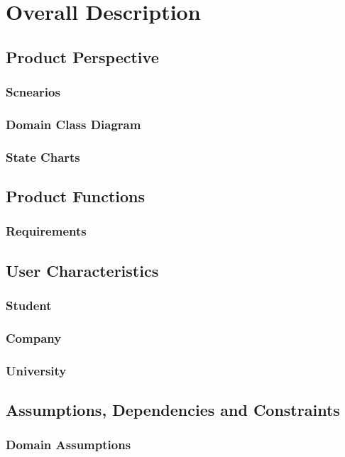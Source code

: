 \chapter{Overall Description}

\section{Product Perspective}
\subsection{Scnearios}
\subsection{Domain Class Diagram}
\subsection{State Charts}

\section{Product Functions}
\subsection{Requirements}

\section{User Characteristics}
\subsection{Student}
\subsection{Company}
\subsection{University}

\section{Assumptions, Dependencies and Constraints}
\subsection{Domain Assumptions}